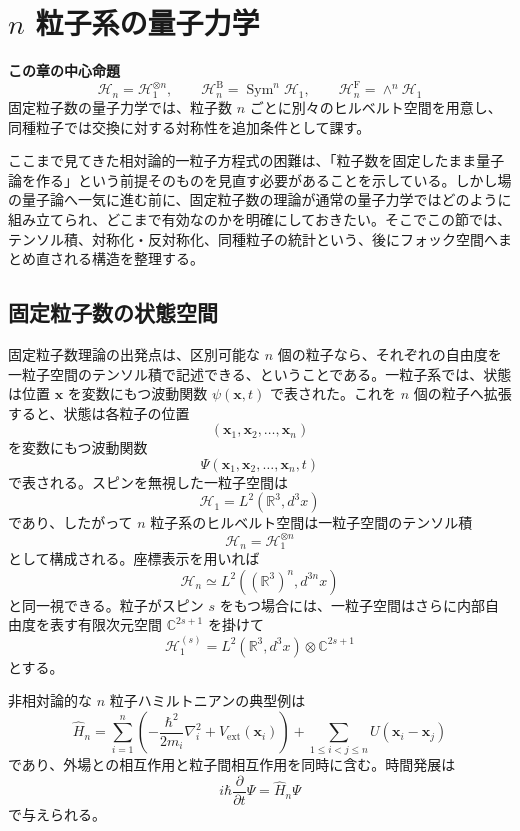 \section{$n$ 粒子系の量子力学}

\noindent\textbf{この章の中心命題}
\[
\boxed{
\mathcal{H}_n=\mathcal{H}_1^{\otimes n},
\qquad
\mathcal{H}_n^{\mathrm{B}}=\operatorname{Sym}^n\mathcal{H}_1,
\qquad
\mathcal{H}_n^{\mathrm{F}}=\wedge^n\mathcal{H}_1
}
\]
固定粒子数の量子力学では、粒子数 $n$ ごとに別々のヒルベルト空間を用意し、同種粒子では交換に対する対称性を追加条件として課す。

ここまで見てきた相対論的一粒子方程式の困難は、「粒子数を固定したまま量子論を作る」という前提そのものを見直す必要があることを示している。しかし場の量子論へ一気に進む前に、固定粒子数の理論が通常の量子力学ではどのように組み立てられ、どこまで有効なのかを明確にしておきたい。そこでこの節では、テンソル積、対称化・反対称化、同種粒子の統計という、後にフォック空間へまとめ直される構造を整理する。

\subsection{固定粒子数の状態空間}
固定粒子数理論の出発点は、区別可能な $n$ 個の粒子なら、それぞれの自由度を一粒子空間のテンソル積で記述できる、ということである。一粒子系では、状態は位置 $\mathbf{x}$ を変数にもつ波動関数 $\psi(\mathbf{x},t)$ で表された。これを $n$ 個の粒子へ拡張すると、状態は各粒子の位置
\[
(\mathbf{x}_1,\mathbf{x}_2,\dots,\mathbf{x}_n)
\]
を変数にもつ波動関数
\[
\Psi(\mathbf{x}_1,\mathbf{x}_2,\dots,\mathbf{x}_n,t)
\]
で表される。スピンを無視した一粒子空間は
\[
\mathcal{H}_1 = L^2(\mathbb{R}^3,d^3x)
\]
であり、したがって $n$ 粒子系のヒルベルト空間は一粒子空間のテンソル積
\[
\mathcal{H}_n = \mathcal{H}_1^{\otimes n}
\]
として構成される。座標表示を用いれば
\[
\mathcal{H}_n \simeq L^2((\mathbb{R}^3)^n,d^{3n}x)
\]
と同一視できる。粒子がスピン $s$ をもつ場合には、一粒子空間はさらに内部自由度を表す有限次元空間 $\mathbb{C}^{2s+1}$ を掛けて
\[
\mathcal{H}_1^{(s)}
=
L^2(\mathbb{R}^3,d^3x)\otimes \mathbb{C}^{2s+1}
\]
とする。

非相対論的な $n$ 粒子ハミルトニアンの典型例は
\[
\hat{H}_n
= \sum_{i=1}^n \left( -\frac{\hbar^2}{2m_i}\nabla_i^2 + V_{\mathrm{ext}}(\mathbf{x}_i) \right)
+ \sum_{1\le i<j\le n} U(\mathbf{x}_i-\mathbf{x}_j)
\]
であり、外場との相互作用と粒子間相互作用を同時に含む。時間発展は
\[
i\hbar \frac{\partial}{\partial t}\Psi = \hat{H}_n \Psi
\]
で与えられる。

